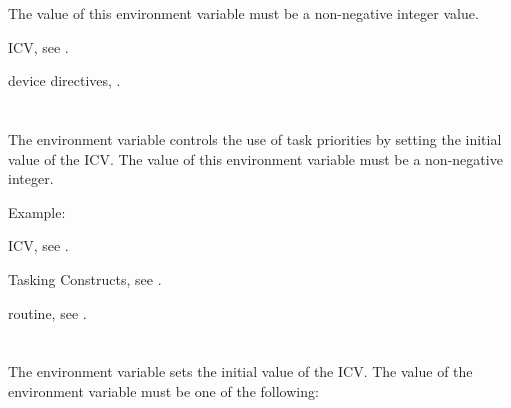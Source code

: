 The value of this environment variable must be a non-negative integer value.

\begin{crossrefs}
\item {} ICV, see .

\item device directives, .
\end{crossrefs}



\section{}
\label{sec:OMP_MAX_TASK_PRIORITY}

The  environment variable controls the use of task
priorities by setting the initial value of the  ICV. The
value of this environment variable must be a non-negative integer.

Example:
\begin{ompEnv}
\end{ompEnv}

\begin{crossrefs}
\item {} ICV, see .

\item Tasking Constructs, see .

\item {} routine, 
see .
\end{crossrefs}



\section{}
\label{sec:OMP_TARGET_OFFLOAD}
The  environment variable sets the initial value of 
the  ICV. The value of the  
environment variable must be one of the following:

